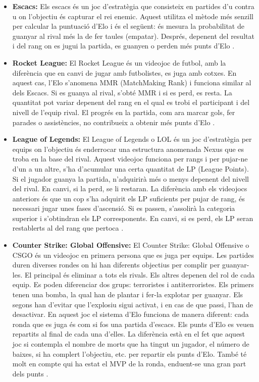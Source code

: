 \documentclass[a4paper]{article}
\begin{document}
\begin{itemize}
    \item \textbf{Escacs:} Els escacs és un joc d'estratègia que consisteix en partides d'u contra u on l'objectiu és capturar el rei enemic. Aquest utilitza el mètode més senzill per calcular la puntuació d'Elo i és el següent: és mesura la probabilitat de guanyar al rival més la de fer taules (empatar). Després, depenent del resultat i del rang on es jugui la partida, es guanyen o perden més punts d'Elo \cite{wikipediaElo}.
    \item \textbf{Rocket League:} El Rocket League és un videojoc de futbol, amb la diferència que en canvi de jugar amb futbolistes, es juga amb cotxes. En aquest cas, l'Elo s'anomena MMR (MatchMaking Rank) i funciona similar al dels Escacs. Si es guanya al rival, s'obté MMR i si es perd, es resta. La quantitat pot variar depenent del rang en el qual es trobi el participant i del nivell de l'equip rival. El progrés en la partida, com ara marcar gols, fer parades o assistències, no contribueix a obtenir més punts d'Elo \cite{rocketElo}.
    \item \textbf{League of Legends:} El League of Legends o LOL és un joc d'estratègia per equips on l'objectiu és enderrocar una estructura anomenada Nexus que es troba en la base del rival. Aquest videojoc funciona per rangs i per pujar-ne d'un a un altre, s'ha d'acumular una certa quantitat de LP (League Points). Si el jugador guanya la partida, n'adquirirà més o menys depenent del nivell del rival. En canvi, si la perd, se li restaran. La diferència amb els videojocs anteriors és que un cop s'ha adquirit els LP suficients per pujar de rang, és necessari jugar unes fases d'ascensió. Si es passen, s'assolirà la categoria superior i s'obtindran els LP corresponents. En canvi, si es perd, els LP seran restablerts al del rang que pertoca \cite{LolElo}.
    \item \textbf{Counter Strike: Global Offensive:} El Counter Strike: Global Offensive o CSGO és un videojoc en primera persona que es juga per equips. Les partides duren diverses rondes on hi han diferents objectius per complir per guanyar-les. El principal és eliminar a tots els rivals. Els altres depenen del rol de cada equip. Es poden diferenciar dos grups: terroristes i antiterroristes. Els primers tenen una bomba, la qual han de plantar i fer-la explotar per guanyar. Els segons han d'evitar que l'explosiu sigui activat, i en cas de que passi, l'han de desactivar.  En aquest joc el sistema d'Elo funciona de manera diferent: cada ronda que es juga és com si fos una partida d'escacs. Els punts d'Elo es veuen repartits al final de cada una d'elles. La diferència està en el fet que aquest joc si contempla el nombre de morts que ha tingut un jugador, el número de baixes, si ha complert l'objectiu, etc. per repartir els punts d'Elo. També té molt en compte qui ha estat el MVP de la ronda, enduent-se una gran part dels punts \cite{csgoELO1} \cite{csgoELO2}. 
\end{itemize}
\end{document}
